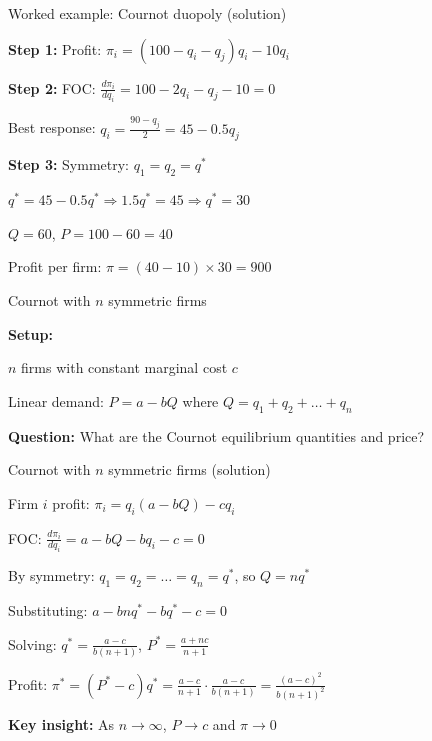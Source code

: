 \documentclass[notes,11pt, aspectratio=169]{beamer}
\newenvironment{wideitemize}{\itemize\addtolength{\itemsep}{10pt}}{\enditemize}
\begin{document}
\begin{frame}{Worked example: Cournot duopoly (solution)}
	\begin{wideitemize}
		\item \textbf{Step 1:} Profit: $\pi_i = (100 - q_i - q_j)q_i - 10q_i$
		\item \textbf{Step 2:} FOC: $\frac{d\pi_i}{dq_i} = 100 - 2q_i - q_j - 10 = 0$
		\item Best response: $q_i = \frac{90 - q_j}{2} = 45 - 0.5q_j$
		\item \textbf{Step 3:} Symmetry: $q_1 = q_2 = q^*$
		\item $q^* = 45 - 0.5q^* \Rightarrow 1.5q^* = 45 \Rightarrow q^* = 30$
		\item $Q = 60$, $P = 100 - 60 = 40$
		\item Profit per firm: $\pi = (40 - 10) \times 30 = 900$
	\end{wideitemize}
\end{frame}

\begin{frame}{Cournot with $n$ symmetric firms}
	\begin{wideitemize}
		\item \textbf{Setup:}
		\item $n$ firms with constant marginal cost $c$
		\item Linear demand: $P = a - bQ$ where $Q = q_1 + q_2 + \ldots + q_n$
		\item \textbf{Question:} What are the Cournot equilibrium quantities and price?
	\end{wideitemize}
\end{frame}

\begin{frame}{Cournot with $n$ symmetric firms (solution)}
	\begin{wideitemize}
		\item Firm $i$ profit: $\pi_i = q_i(a - bQ) - cq_i$
		\item FOC: $\frac{d\pi_i}{dq_i} = a - bQ - bq_i - c = 0$
		\item By symmetry: $q_1 = q_2 = \ldots = q_n = q^*$, so $Q = nq^*$
		\item Substituting: $a - bnq^* - bq^* - c = 0$
		\item Solving: $q^* = \frac{a-c}{b(n+1)}$, \quad $P^* = \frac{a + nc}{n+1}$
		\item Profit: $\pi^* = (P^* - c)q^* = \frac{a-c}{n+1} \cdot \frac{a-c}{b(n+1)} = \frac{(a-c)^2}{b(n+1)^2}$
		\item \textbf{Key insight:} As $n \to \infty$, $P \to c$ and $\pi \to 0$
	\end{wideitemize}
\end{frame}
\end{document}
